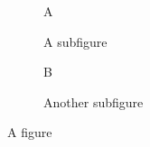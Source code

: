 
\begin{figure}[h]
\begin{subfigure}[b]{.5\linewidth}
\centering\large A
\caption{A subfigure}\label{fig:1a}
\end{subfigure}%
\begin{subfigure}[b]{.5\linewidth}
\centering\large B
\caption{Another subfigure}\label{fig:1b}
\end{subfigure}
\caption{A figure}\label{fig:1}
\end{figure}